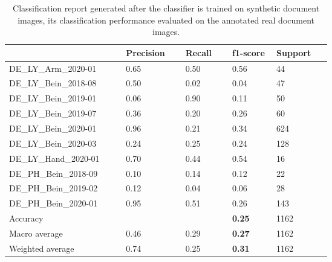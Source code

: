 \begin{center}
\begin{table}[H]
    \centering
    \begin{center}
    \begin{tabular}{P{0.22\linewidth} P{0.10\linewidth} P{0.10\linewidth} P{0.10\linewidth} P{0.10\linewidth}} 
        \toprule
            & Precision & Recall & f1-score & Support\\[0.0ex] 
        \midrule
        DE\_LY\_Arm\_2020-01 & 0.65 & 0.50 & 0.56 & 44\\[0.0ex]
        \midrule
        DE\_LY\_Bein\_2018-08 & 0.50 & 0.02 & 0.04 & 47\\[0.0ex]
        \midrule
        DE\_LY\_Bein\_2019-01 & 0.06 & 0.90 & 0.11 & 50\\[0.0ex]
        \midrule
        DE\_LY\_Bein\_2019-07 & 0.36 & 0.20 & 0.26 & 60\\[0.0ex]
        \midrule
        DE\_LY\_Bein\_2020-01 & 0.96 & 0.21 & 0.34 & 624\\[0.0ex]
        \midrule
        DE\_LY\_Bein\_2020-03 & 0.24 & 0.25 & 0.24 & 128\\[0.0ex]
        \midrule
        DE\_LY\_Hand\_2020-01 & 0.70 & 0.44 & 0.54 & 16\\[0.0ex]
        \midrule
        DE\_PH\_Bein\_2018-09 & 0.10 & 0.14 & 0.12 & 22\\[0.0ex]
        \midrule
        DE\_PH\_Bein\_2019-02 & 0.12 & 0.04 & 0.06 & 28\\[0.0ex]
        \midrule
        DE\_PH\_Bein\_2020-01 & 0.95 & 0.51 & 0.26 & 143\\[0.0ex]
        \midrule
        \midrule
        Accuracy              &      &      & \bf{0.25} & 1162\\[0.0ex]
        Macro average             & 0.46 & 0.29 &  \bf{0.27} & 1162\\[0.0ex]
        Weighted average          & 0.74 & 0.25 &  \bf{0.31} & 1162\\[0.0ex]
        \bottomrule
    \end{tabular}
    \caption[Classification report generated after the classifier is trained on synthetic document images, its classification performance evaluated on the annotated real document images.]{Classification report generated after the classifier is trained on synthetic document images, its classification performance evaluated on the annotated real document images.}
    \label{table:SyntheticClassificationReport}
    \end{center}
\end{table}
\end{center}



